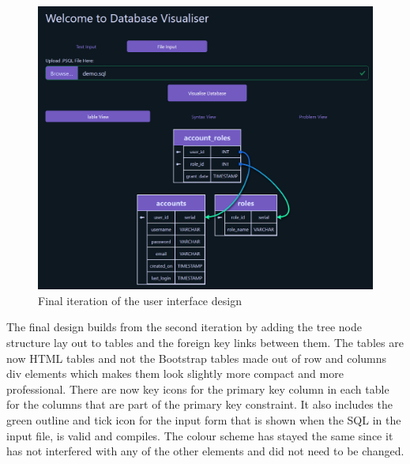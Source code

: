 \begin{figure}[h!]
	\centering
	\includegraphics[width=\textwidth]{finalDesign}
	\caption{Final iteration of the user interface design}
	\label{fig:finalDesign}
\end{figure}

The final design builds from the second iteration by adding the tree node structure lay out to tables and the foreign key links between them. The tables are now HTML tables and not the Bootstrap tables made out of row and columns div elements which makes them look slightly more compact and more professional. There are now key icons for the primary key column in each table for the columns that are part of the primary key constraint. It also includes the green outline and tick icon for the input form that is shown when the SQL in the input file, is valid and compiles. The colour scheme has stayed the same since it has not interfered with any of the other elements and did not need to be changed. 
